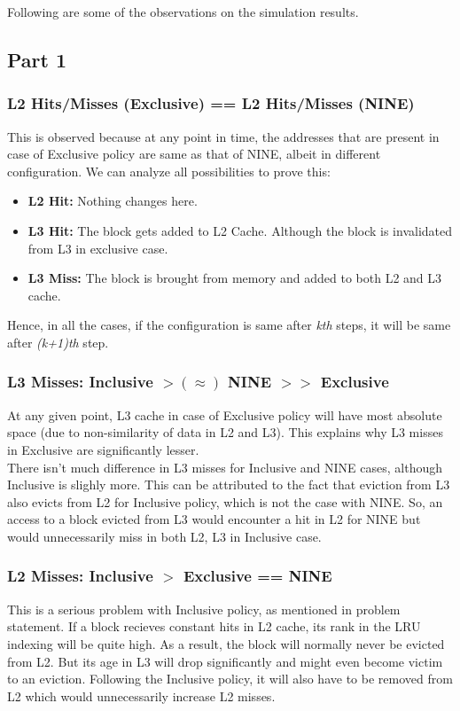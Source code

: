     Following are some of the observations on the simulation results.
\subsection{Part 1}
\subsubsection{L2 Hits/Misses (Exclusive) == L2 Hits/Misses (NINE)}
This is observed because at any point in time, the addresses that are present in case of Exclusive 
policy are same as that of NINE, albeit in different configuration. We can analyze all 
possibilities to prove this:
\begin{itemize}
	\item \textbf{L2 Hit:} Nothing changes here.
	\item \textbf{L3 Hit:} The block gets added to L2 Cache. Although the block is invalidated from L3 in exclusive case.
	\item \textbf{L3 Miss:} The block is brought from memory and added to both L2 and L3 cache.
\end{itemize}
Hence, in all the cases, if the configuration is same after \textit{kth} steps, it will be same 
after \textit{(k+1)th} step.

\subsubsection{L3 Misses: Inclusive $ >(\approx)$ NINE $>>$ Exclusive}
At any given point, L3 cache in case of Exclusive policy will have most absolute space (due to 
non-similarity of data in L2 and L3). This explains why L3 misses in Exclusive are significantly 
lesser.\\
There isn't much difference in L3 misses for Inclusive and NINE cases, although Inclusive is 
slighly more. This can be attributed to the fact that eviction from L3 also evicts from L2 for 
Inclusive policy, which is not the case with NINE. So, an access to a block evicted from L3 would
encounter a hit in L2 for NINE but would unnecessarily miss in both L2, L3 in Inclusive case.

\subsubsection{L2 Misses: Inclusive $>$ Exclusive == NINE}
This is a serious problem with Inclusive policy, as mentioned in problem statement. If a block 
recieves constant hits in L2 cache, its rank in the LRU indexing will be quite high. As a result,
the block will normally never be evicted from L2. But its age in L3 will drop significantly and
 might even become victim to an eviction. Following the Inclusive policy, it will also have to be
removed from L2 which would unnecessarily increase L2 misses.

